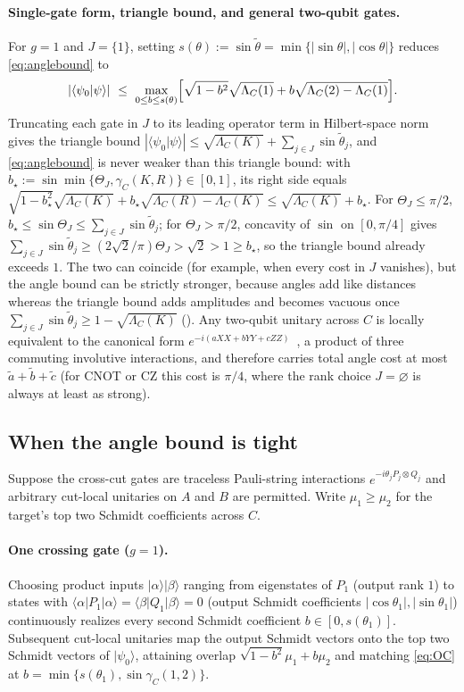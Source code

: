 \documentclass[reprint,aps,pra,floatfix,superscriptaddress,nofootinbib,longbibliography]{revtex4-2}
\theoremstyle{remark}
\theoremstyle{definition}
\newcommand{\ket}[1]{\lvert #1 \rangle}
\newcommand{\bra}[1]{\langle #1 \rvert}
\newcommand{\braket}[2]{\langle #1 \vert #2 \rangle}
\begin{document}
\paragraph{Single-gate form, triangle bound, and general two-qubit gates.}
For $g=1$ and $J=\{1\}$, setting $s(\theta):=\sin\tilde\theta=\min\{|\sin\theta|,|\cos\theta|\}$
reduces \eqref{eq:anglebound} to
\begin{equation}
  \label{eq:OC}
  |\braket{\psi_0}{\psi}|\ \le\ \max_{0\le b\le s(\theta)}
  \Bigl[\sqrt{1-b^2}\sqrt{\Lambda_C(1)}+b\sqrt{\Lambda_C(2)-\Lambda_C(1)}\Bigr].
\end{equation}
Truncating each gate in $J$ to its leading operator term in Hilbert-space norm
gives the triangle bound
$|\braket{\psi_0}{\psi}|\le\sqrt{\Lambda_C(K)}+\sum_{j\in J}\sin\tilde\theta_j$,
and \eqref{eq:anglebound} is never weaker than this triangle bound: with
$b_\star:=\sin\min\{\Theta_J,\gamma_C(K,R)\}\in[0,1]$, its right side equals
$\sqrt{1-b_\star^2}\sqrt{\Lambda_C(K)}+b_\star\sqrt{\Lambda_C(R)-\Lambda_C(K)}\le\sqrt{\Lambda_C(K)}+b_\star$.
For $\Theta_J\le\pi/2$, $b_\star\le\sin\Theta_J\le\sum_{j\in J}\sin\tilde\theta_j$;
for $\Theta_J>\pi/2$, concavity of $\sin$ on $[0,\pi/4]$ gives
$\sum_{j\in J}\sin\tilde\theta_j\ge(2\sqrt{2}/\pi)\Theta_J>\sqrt{2}>1\ge b_\star$,
so the triangle bound already exceeds $1$. The two can coincide (for example,
when every cost in $J$ vanishes), but the angle bound can be strictly stronger, because angles add like distances whereas the triangle bound adds
amplitudes and becomes vacuous once
$\sum_{j\in J}\sin\tilde\theta_j\ge1-\sqrt{\Lambda_C(K)}$ ().
Any two-qubit unitary across $C$ is locally equivalent to the canonical
form $e^{-i(aXX+bYY+cZZ)}$~\cite{kraus2001optimal}, a product of three commuting
involutive interactions, and therefore carries total angle cost at most
$\tilde a+\tilde b+\tilde c$ (for CNOT or CZ this cost is $\pi/4$, where the rank
choice $J=\varnothing$ is always at least as strong).

\subsection{When the angle bound is tight}
\label{app:tight}

Suppose the cross-cut gates are traceless Pauli-string interactions
$e^{-i\theta_j P_j\otimes Q_j}$ and arbitrary cut-local unitaries on $A$ and $B$
are permitted. Write $\mu_1\ge\mu_2$ for the target's top two Schmidt
coefficients across $C$.

\paragraph{One crossing gate ($g=1$).}
Choosing product inputs $\ket{\alpha}\ket{\beta}$ ranging from eigenstates of
$P_1$ (output rank $1$) to states with $\bra{\alpha}P_1\ket{\alpha}=\bra{\beta}Q_1\ket{\beta}=0$
(output Schmidt coefficients $|\cos\theta_1|,|\sin\theta_1|$) continuously
realizes every second Schmidt coefficient $b\in[0,s(\theta_1)]$. Subsequent
cut-local unitaries map the output Schmidt vectors onto the top two Schmidt
vectors of $\ket{\psi_0}$, attaining overlap $\sqrt{1-b^2}\mu_1+b\mu_2$ and
matching \eqref{eq:OC} at $b=\min\{s(\theta_1),\sin\gamma_C(1,2)\}$.
\end{document}
